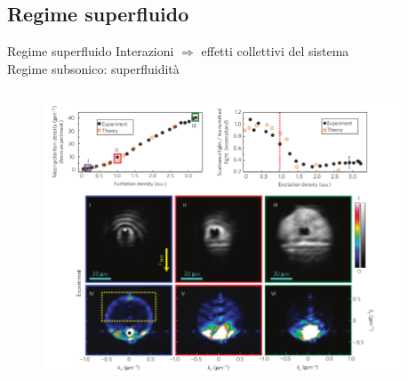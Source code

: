 \subsection{Regime superfluido}%
\begin{frame}{Regime superfluido}
  Interazioni $\Rightarrow$ effetti collettivi del sistema\\
      Regime subsonico: superfluidità\\
  \begin{columns}[t]
  
    \begin{column}{.7\textwidth}
     \begin{figure}
  \centering
    \includegraphics[width=\columnwidth]{pics/scattering-super-all.png}
  \end{figure}
  \hspace{-10pt}
    \end{column}
    \begin{column}{.3\textwidth}
    

\end{column}
\end{columns}
\end{frame}
